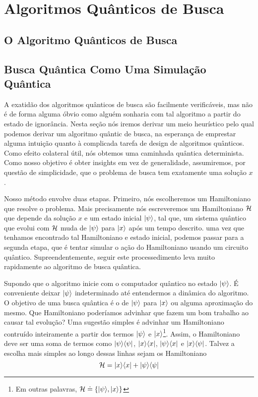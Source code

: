 \chapter{Algoritmos Quânticos de Busca}

\section{O Algoritmo Quânticos de Busca}

\section{Busca Quântica Como Uma Simulação Quântica} 

A exatidão dos algoritmos quânticos de busca são facilmente verificáveis, mas não é de forma alguma óbvio como alguém sonharia com tal algoritmo a partir do estado de ignorância. Nesta seção nós iremos derivar um meio heurístico pelo qual podemos derivar um algoritmo quântic de busca, na esperança de emprestar alguma intuição quanto à complicada tarefa de design de algoritmos quânticos. Como efeito colateral útil, nós obtemos uma caminhada quântica determinista. Como nosso objetivo é obter insights em vez de generalidade, assumiremos, por questão de simplicidade, que o problema de busca tem exatamente uma solução $x$.

Nosso método envolve duas etapas. Primeiro, nós escolheremos um Hamiltoniano que resolve o problema. Mais precisamente nós escreveremos um Hamiltoniano $\mathcal{H}$ que depende da solução $x$ e um estado inicial $\vert \psi \rangle$, tal que, um sistema quântico que evolui com $\mathcal{H}$ muda de $\vert \psi \rangle$ para $\vert x \rangle$ após um tempo descrito. uma vez que tenhamos encontrado tal Hamiltoniano e estado inicial, podemos passar para a segunda etapa, que é tentar simular o ação do Hamiltoniano usando um circuito quântico. Supreendentemente, seguir este processedimento leva muito rapidamente ao algoritmo de busca quântica.

Supondo que o algoritmo inicie com o computador quântico no estado $\vert \psi \rangle$. É conveniente deixar $\vert \psi \rangle$ indeterminado até entendermos a dinâmica do algoritmo. O objetivo de uma busca quântica é o de $\vert \psi \rangle$ para $\vert x \rangle$ ou alguma aproximação do mesmo. Que Hamiltoniano poderíamos advinhar que fazem um bom trabalho ao causar tal evolução? Uma sugestão simples é advinhar um Hamiltoniano contruído inteiramente a partir dos termos $\vert \psi \rangle$ e $\vert x \rangle$\footnote{Em outras palavras, $\mathcal{H} \doteq \left\{\vert \psi \rangle, \vert x \rangle\right\} $}. Assim, o Hamiltoniano deve ser uma soma de termos como $\vert \psi \rangle\langle \psi \vert$, $\vert x \rangle\langle x \vert$, $\vert \psi \rangle\langle x \vert$ e $\vert x \rangle\langle \psi \vert$. Talvez a escolha mais simples ao longo dessas linhas sejam os Hamiltoniano
\begin{equation}
    \mathcal{H} = \vert x \rangle\langle x \vert + \vert \psi \rangle\langle \psi \vert
    \label{H_escolhido}
\end{equation}

